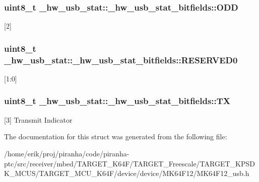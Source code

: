 \subsubsection[{\texorpdfstring{O\+DD}{ODD}}]{\setlength{\rightskip}{0pt plus 5cm}uint8\+\_\+t \+\_\+hw\+\_\+usb\+\_\+stat\+::\+\_\+hw\+\_\+usb\+\_\+stat\+\_\+bitfields\+::\+O\+DD}\hypertarget{struct__hw__usb__stat_1_1__hw__usb__stat__bitfields_afa0909dffc33a2ed9e7506ddb6b00367}{}\label{struct__hw__usb__stat_1_1__hw__usb__stat__bitfields_afa0909dffc33a2ed9e7506ddb6b00367}
\mbox{[}2\mbox{]} 
\subsubsection[{\texorpdfstring{R\+E\+S\+E\+R\+V\+E\+D0}{RESERVED0}}]{\setlength{\rightskip}{0pt plus 5cm}uint8\+\_\+t \+\_\+hw\+\_\+usb\+\_\+stat\+::\+\_\+hw\+\_\+usb\+\_\+stat\+\_\+bitfields\+::\+R\+E\+S\+E\+R\+V\+E\+D0}\hypertarget{struct__hw__usb__stat_1_1__hw__usb__stat__bitfields_a3ac9da2a002b842c76fc8728796897a2}{}\label{struct__hw__usb__stat_1_1__hw__usb__stat__bitfields_a3ac9da2a002b842c76fc8728796897a2}
\mbox{[}1\+:0\mbox{]} 
\subsubsection[{\texorpdfstring{TX}{TX}}]{\setlength{\rightskip}{0pt plus 5cm}uint8\+\_\+t \+\_\+hw\+\_\+usb\+\_\+stat\+::\+\_\+hw\+\_\+usb\+\_\+stat\+\_\+bitfields\+::\+TX}\hypertarget{struct__hw__usb__stat_1_1__hw__usb__stat__bitfields_aac29a13f58e9fd77fd47043aead477c9}{}\label{struct__hw__usb__stat_1_1__hw__usb__stat__bitfields_aac29a13f58e9fd77fd47043aead477c9}
\mbox{[}3\mbox{]} Transmit Indicator 

The documentation for this struct was generated from the following file\+:\begin{DoxyCompactItemize}
\item 
/home/erik/proj/piranha/code/piranha-\/ptc/src/receiver/mbed/\+T\+A\+R\+G\+E\+T\+\_\+\+K64\+F/\+T\+A\+R\+G\+E\+T\+\_\+\+Freescale/\+T\+A\+R\+G\+E\+T\+\_\+\+K\+P\+S\+D\+K\+\_\+\+M\+C\+U\+S/\+T\+A\+R\+G\+E\+T\+\_\+\+M\+C\+U\+\_\+\+K64\+F/device/device/\+M\+K64\+F12/M\+K64\+F12\+\_\+usb.\+h\end{DoxyCompactItemize}
